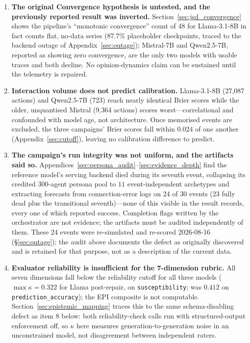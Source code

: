 \documentclass[11pt,journal,onecolumn]{IEEEtran}
\begin{document}
\begin{enumerate}
    \item \textbf{The original Convergence hypothesis is untested, and the previously reported result was inverted.} Section~\ref{sec:jsd_convergence} shows the pipeline's ``monotonic convergence'' count of 48 for Llama-3.1-8B in fact counts flat, no-data series ($87.7\%$ placeholder checkpoints, traced to the backend outage of Appendix~\ref{sec:outage}); Mistral-7B and Qwen2.5-7B, reported as showing zero convergence, are the only two models with usable traces and both decline. No opinion-dynamics claim can be sustained until the telemetry is repaired.
    \item \textbf{Interaction volume does not predict calibration.} Llama-3.1-8B (27,087 actions) and Qwen2.5-7B (723) reach nearly identical Brier scores while the older, unquantised Mistral (9,364 actions) scores worst---correlational and confounded with model age, not architecture. Once memorised events are excluded, the three campaigns' Brier scores fall within $0.024$ of one another (Appendix~\ref{sec:cutoff}), leaving no calibration difference to predict.
    \item \textbf{The campaign's run integrity was not uniform, and the artifacts said so.} Appendices~\ref{sec:persona_audit}--\ref{sec:evidence_depth} find the reference model's serving backend died during its seventh event, collapsing its credited $300$-agent persona pool to $11$ event-independent archetypes and extracting forecasts from connection-error logs on 24 of 30 events (23 fully dead plus the transitional seventh)---none of this visible in the result records, every one of which reported success. Completion flags written by the orchestrator are not evidence; the artifacts must be audited independently of them. These 24 events were re-simulated and re-scored 2026-08-16 (\S\ref{sec:outage}); the audit above documents the defect as originally discovered and is retained for that purpose, not as a description of the current data.
    \item \textbf{Evaluator reliability is insufficient for the 7-dimension rubric.} All seven dimensions fall below the reliability cutoff for all three models ($\max \kappa = 0.322$ for Llama post-repair, on \texttt{susceptibility}; was $0.412$ on \texttt{prediction\_accuracy}); the EPI composite is not computable. Section~\ref{sec:epistemic_mapping} traces this to the same schema-disabling defect as item 8 below: both reliability-check calls run with structured-output enforcement off, so $\kappa$ here measures generation-to-generation noise in an unconstrained model, not disagreement between independent raters.

\end{enumerate}
\end{document}
